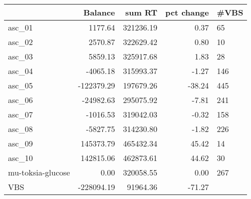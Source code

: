 \begin{tabular}{lrrrl}
\toprule
{} &    Balance &     sum RT &  pct change & \#VBS \\
\midrule
asc\_01            &    1177.64 &  321236.19 &        0.37 &   65 \\
asc\_02            &    2570.87 &  322629.42 &        0.80 &   10 \\
asc\_03            &    5859.13 &  325917.68 &        1.83 &   28 \\
asc\_04            &   -4065.18 &  315993.37 &       -1.27 &  146 \\
asc\_05            & -122379.29 &  197679.26 &      -38.24 &  445 \\
asc\_06            &  -24982.63 &  295075.92 &       -7.81 &  241 \\
asc\_07            &   -1016.53 &  319042.03 &       -0.32 &  158 \\
asc\_08            &   -5827.75 &  314230.80 &       -1.82 &  226 \\
asc\_09            &  145373.79 &  465432.34 &       45.42 &   14 \\
asc\_10            &  142815.06 &  462873.61 &       44.62 &   30 \\
mu-toksia-glucose &       0.00 &  320058.55 &        0.00 &  267 \\
VBS               & -228094.19 &   91964.36 &      -71.27 &      \\
\bottomrule
\end{tabular}
